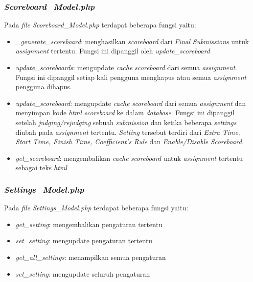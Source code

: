 \subsubsection{\textit{Scoreboard\_Model.php}}
Pada \textit{file} \textit{Scoreboard\_Model.php} terdapat beberapa fungsi yaitu:
\begin{itemize}
	\item \textit{\_generate\_scoreboard}: menghasilkan \textit{scoreboard} dari \textit{Final Submissions} untuk \textit{assignment} tertentu. Fungsi ini dipanggil oleh \textit{update\_scoreboard}
	\item \textit{update\_scoreboards}: mengupdate \textit{cache} \textit{scoreboard} dari semua \textit{assignment}. Fungsi ini dipanggil setiap kali pengguna menghapus atau semua \textit{assignment} pengguna dihapus.
	\item \textit{update\_scoreboard}: mengupdate \textit{cache scoreboard} dari semua \textit{assignment} dan menyimpan kode \textit{html scoreboard} ke dalam \textit{database}. Fungsi ini dipanggil setelah \textit{judging/rejudging} sebuah \textit{submission} dan ketika beberapa \textit{settings} diubah pada \textit{assignment} tertentu. \textit{Setting} tersebut terdiri dari \textit{Extra Time, Start Time, Finish Time, Coefficient's Rule} dan \textit{Enable/Disable Scoreboard}.
	\item \textit{get\_scoreboard}: mengembalikan \textit{cache} \textit{scoreboard} untuk \textit{assignment} tertentu sebagai teks \textit{html}
\end{itemize}

\subsubsection{\textit{Settings\_Model.php}}
Pada \textit{file} \textit{Settings\_Model.php} terdapat beberapa fungsi yaitu:
\begin{itemize}
	\item \textit{get\_setting}: mengembalikan pengaturan tertentu
	\item \textit{set\_setting}: mengupdate pengaturan tertentu
	\item \textit{get\_all\_settings}: menampilkan semua pengaturan
	\item \textit{set\_setting}: mengupdate seluruh pengaturan
\end{itemize}

